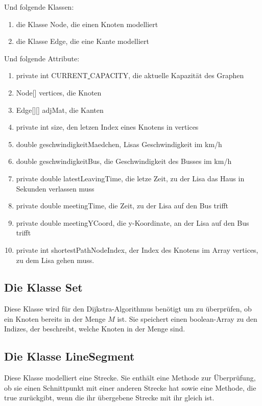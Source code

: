 \documentclass[a4paper,10pt,ngerman]{scrartcl}
\begin{document}
Und folgende Klassen:
\begin{enumerate}
\item die Klasse Node, die einen Knoten modelliert
\item die Klasse Edge, die eine Kante modelliert
\end{enumerate}
Und folgende Attribute:
\begin{enumerate}
\item private int CURRENT\underline{ }CAPACITY, die aktuelle Kapazität des Graphen
\item Node[] vertices, die Knoten
\item Edge[][] adjMat, die Kanten
\item private int size, den letzen Index eines Knotens in vertices
\item double geschwindigkeitMaedchen, Lisas Geschwindigkeit im km/h
\item  double geschwindigkeitBus, die Geschwindigkeit des Busses im km/h
\item private double latestLeavingTime, die letze Zeit, zu der Lisa das Haus in Sekunden verlassen muss
\item  private double meetingTime, die Zeit, zu der Lisa auf den Bus trifft
\item private double meetingYCoord, die y-Koordinate, an der Lisa auf den Bus trifft
\item private int shortestPathNodeIndex, der Index des Knotens im Array vertices, zu dem Lisa gehen muss.
\end{enumerate}
\subsection{Die Klasse Set}
Diese Klasse wird für den Dijkstra-Algorithmus benötigt um zu überprüfen, ob ein Knoten bereits in der Menge $M$ ist. Sie speichert einen boolean-Array zu den Indizes, der beschreibt, welche Knoten in der Menge sind.
\subsection{Die Klasse LineSegment}
Diese Klasse modelliert eine Strecke. Sie enthält eine Methode zur Überprüfung, ob sie einen Schnittpunkt mit einer anderen Strecke hat sowie eine Methode, die true zurückgibt, wenn die ihr übergebene Strecke mit ihr gleich ist.
\end{document}
